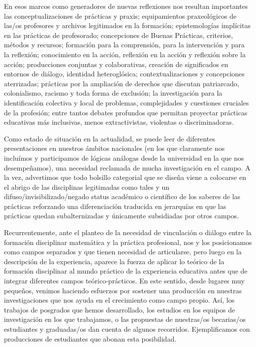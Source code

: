 \documentclass[oneside,spanish]{amsart}
\numberwithin{equation}{section}
\numberwithin{figure}{section}
\theoremstyle{definition}
\begin{document}
En esos marcos como generadores de nuevas reflexiones nos resultan importantes las conceptualizaciones de prácticas y praxis; equipamientos praxeológicos de las/os profesores y archivos legitimados en la formación; epistemologías implícitas en las prácticas de profesorado; concepciones de Buenas Prácticas, criterios, métodos y recursos; formación para la comprensión, para la intervención y para la reflexión; conocimiento en la acción, reflexión en la acción y reflexión sobre la acción; producciones conjuntas y colaborativas, creación de significados en entornos de diálogo, identidad heteroglósica; contextualizaciones y concepciones aterrizadas; prácticas por la ampliación de derechos que discutan patriarcado, colonialismo, racismo y toda forma de exclusión; la investigación para la identificación colectiva y local de problemas, complejidades y cuestiones cruciales de la profesión;  entre tantos debates profundos que permitan proyectar prácticas educativas más inclusivas, menos extractivistas, violentas o discriminadoras.

Como estado de situación en la actualidad, se puede leer de diferentes presentaciones en nuestros ámbitos nacionales (en los que claramente nos incluímos y participamos de lógicas análogas desde la universidad en la que nos desempeñamos), una necesidad reclamada de mucha investigación en el campo. A la vez, advertimos que todo bolsillo categorial que se diseña viene a colocarse en el abrigo de las disciplinas legitimadas como tales y un difuso/invisibilizado/negado status académico o científico de los saberes de las prácticas reforzando una diferenciación traducida en jerarquías en que las prácticas quedan subalternizadas y únicamente subsidiadas por otros campos. 

Recurrentemente, ante el planteo de la necesidad de vinculación o diálogo entre la formación disciplinar matemática y la práctica profesional, nos y los posicionamos como campos separados y que tienen necesidad de articularse, pero luego en la descripción de la experiencia, aparece la fuerza de aplicar lo teórico de la formación disciplinar al mundo práctico de la experiencia educativa antes que de integrar diferentes campos teórico-prácticos. En este sentido, desde lugares muy pequeños, venimos haciendo esfuerzos por sostener una producción en nuestras investigaciones que nos ayuda en el crecimiento como campo propio. Así, los trabajos de posgrados que hemos desarrollado, los estudios en los equipos de investigación en los que trabajamos, o las propuestas de nuestras/os becarias/os estudiantes y graduadas/os dan cuenta de algunos recorridos. Ejemplificamos con producciones de estudiantes que abonan esta posibilidad.  
\end{document}
